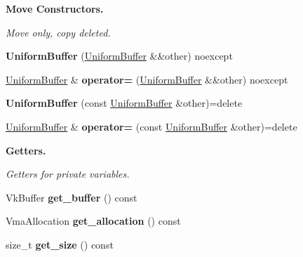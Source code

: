 \begin{Indent}\textbf{ Move Constructors.}\par
{\em Move only, copy deleted. }\begin{DoxyCompactItemize}
\item 
\mbox{\label{classblaze_1_1UniformBuffer_aa569ddbf07e9597b1e6de52e6b85db6e}} 
{\bfseries Uniform\+Buffer} (\hyperlink{classblaze_1_1UniformBuffer}{Uniform\+Buffer} \&\&other) noexcept
\item 
\mbox{\label{classblaze_1_1UniformBuffer_aa5707c20bc30f08bf965c3511035f4e5}} 
\hyperlink{classblaze_1_1UniformBuffer}{Uniform\+Buffer} \& {\bfseries operator=} (\hyperlink{classblaze_1_1UniformBuffer}{Uniform\+Buffer} \&\&other) noexcept
\item 
\mbox{\label{classblaze_1_1UniformBuffer_aaa05f134789fce6d1b6a07b38a7fff09}} 
{\bfseries Uniform\+Buffer} (const \hyperlink{classblaze_1_1UniformBuffer}{Uniform\+Buffer} \&other)=delete
\item 
\mbox{\label{classblaze_1_1UniformBuffer_a7668882a3ce8067e2d8f0c6d5c6cbb1e}} 
\hyperlink{classblaze_1_1UniformBuffer}{Uniform\+Buffer} \& {\bfseries operator=} (const \hyperlink{classblaze_1_1UniformBuffer}{Uniform\+Buffer} \&other)=delete
\end{DoxyCompactItemize}
\end{Indent}
\begin{Indent}\textbf{ Getters.}\par
{\em Getters for private variables. }\begin{DoxyCompactItemize}
\item 
\mbox{\label{classblaze_1_1UniformBuffer_ac7179f41102e04372d908e5a06558184}} 
Vk\+Buffer {\bfseries get\+\_\+buffer} () const
\item 
\mbox{\label{classblaze_1_1UniformBuffer_a7cba3219dbf94b52cbc0f5cf649fb7d1}} 
Vma\+Allocation {\bfseries get\+\_\+allocation} () const
\item 
\mbox{\label{classblaze_1_1UniformBuffer_af1492864fff54bc4b845bcf85b582aaa}} 
size\+\_\+t {\bfseries get\+\_\+size} () const
\end{DoxyCompactItemize}
\end{Indent}


